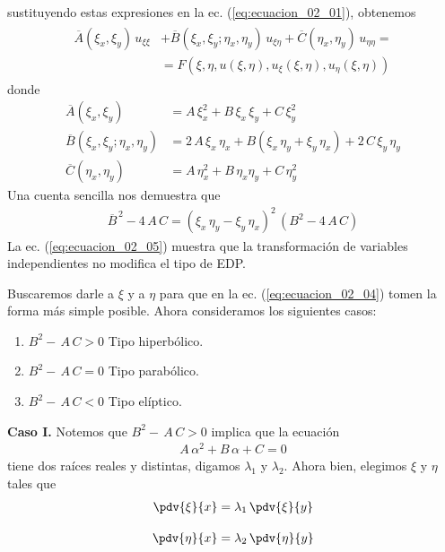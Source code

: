 sustituyendo estas expresiones en la ec. (\ref{eq:ecuacion_02_01}), obtenemos
\begin{align}
\begin{aligned}
\overline{A} (\xi_{x}, \xi_{y}) \, u_{\xi \xi} &+ \overline{B} (\xi_{x}, \xi_{y}; \eta_{x},\eta_{y}) \, u_{\xi \eta} + \overline{C} (\eta_{x}, \eta_{y}) \, u_{\eta \eta} = \\
&= F (\xi, \eta, u(\xi, \eta), u_{\xi}( \xi, \eta), u_{\eta} (\xi, \eta))
\end{aligned}
\label{eq:ecuacion_02_04}    
\end{align}
donde
\begin{align*}
\overline{A} (\xi_{x}, \xi_{y}) &= A \, \xi_{x}^{2} + B \, \xi_{x} \, \xi_{y} + C \, \xi_{y}^{2} \\
\overline{B} (\xi_{x}, \xi_{y}; \eta_{x},\eta_{y}) &= 2 \, A \, \xi_{x} \, \eta_{x} + B (\xi_{x} \, \eta_{y} + \xi_{y} \, \eta_{x}) + 2 \, C \, \xi_{y} \, \eta_{y} \\
\overline{C} (\eta_{x}, \eta_{y}) &= A \, \eta_{x}^{2} + B \, \eta_{x} \eta_{y} + C \, \eta_{y}^{2}
\end{align*}
Una cuenta sencilla nos demuestra que
\begin{align}
\overline{B}^{\, 2} - 4 \, A \, C = (\xi_{x} \, \eta_{y} - \xi_{y} \, \eta_{x})^{2} \, (B^{2} - 4 \, A \, C)
\label{eq:ecuacion_02_05}    
\end{align}
La ec. (\ref{eq:ecuacion_02_05}) muestra que la transformación de variables independientes no modifica el tipo de EDP.
\par
Buscaremos darle a $\xi$ y a $\eta$ para que en la ec. (\ref{eq:ecuacion_02_04}) tomen la forma más simple posible. Ahora consideramos los siguientes casos:
\begin{enumerate}[label=\textbf{Caso \Roman*.}]
\item $B^{2} -  \, A \, C > 0$ Tipo hiperbólico.
\item $B^{2} -  \, A \, C = 0$ Tipo parabólico.
\item $B^{2} -  \, A \, C < 0$ Tipo elíptico.
\end{enumerate}
\textbf{Caso I. } Notemos que $B^{2} -  \, A \, C > 0$ implica que la ecuación
\begin{align*}
A \, \alpha^{2} + B \, \alpha + C = 0
\end{align*}
tiene dos raíces reales y distintas, digamos $\lambda_{1}$ y $\lambda_{2}$. Ahora bien, elegimos $\xi$ y $\eta$ tales que
\begin{align}
\begin{aligned}
\pdv{\xi}{x} &= \lambda_{1} \, \pdv{\xi}{y} \\[1em]
\pdv{\eta}{x} &= \lambda_{2} \, \pdv{\eta}{y}
\end{aligned}
\label{eq:ecuacion_02_06}    
\end{align}
